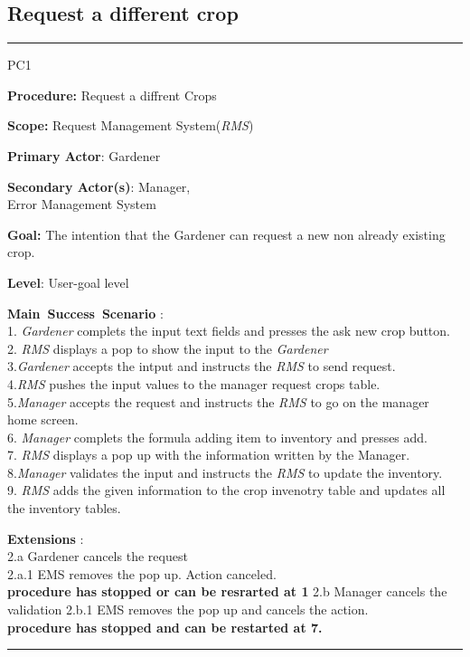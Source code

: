 \subsection{Request a different crop}
\vspace{0.5cm}
\hrule
\hfill
\begin{lyxlist}{PC1}
\small{
\item [\textbf{Procedure:}] Request a diffrent Crops
\item [\textbf{Scope:}] Request Management System(\emph{RMS})
\item [\textbf{Primary Actor}:] Gardener
\item [\textbf{Secondary Actor(s)}:] Manager,\\
Error Management System
\item [\textbf{Goal:}] The intention that the Gardener can request a new
non already existing crop.
\item [\textbf{Level}:] User-goal level
\item [\textbf{Main~Success~Scenario}]:\\
1. \emph{Gardener} complets the input text fields and presses the ask new crop
button.\\
2. \emph{RMS} displays a pop to show the input to the \emph{Gardener}\\
3.\emph{Gardener} accepts the intput and instructs the \emph{RMS} to send
request.\\
4.\emph{RMS} pushes the input values to the manager request crops table.\\
5.\emph{Manager} accepts the request and instructs the \emph{RMS} to go on
the manager home screen.\\
6. \emph{Manager} complets the formula adding item to inventory and presses
add.\\
7. \emph{RMS} displays a pop up with the information written by the Manager.\\
8.\emph{Manager} validates the input and instructs the \emph{RMS} to update the
inventory.\\
9. \emph{RMS} adds the given information to the crop invenotry table and
updates all the inventory tables.
\item [\textbf{Extensions}]:\\
2.a Gardener cancels the request\\
\hspace*{0.5cm} 2.a.1 {EMS} removes the pop up. Action canceled.\\
\hspace*{0.5cm} \textbf{procedure has stopped or can be resrarted at 1}
2.b Manager cancels the validation
\hspace*{0.5cm}2.b.1 {EMS} removes the pop up and cancels the action.\\
\hspace*{0.5cm}\textbf{procedure has stopped and can be restarted at 7.}
}
\end{lyxlist}
\hrule
\vspace{0.5cm}


